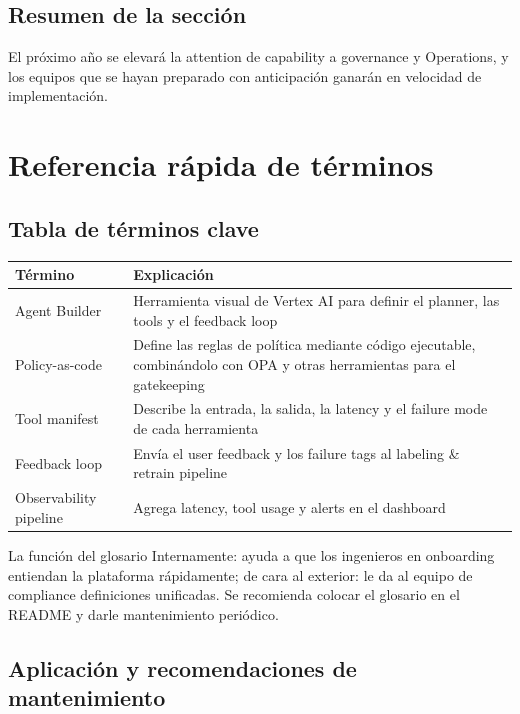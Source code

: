\documentclass[a4paper]{article}
\begin{document}
\subsection{Resumen de la sección}

El próximo año se elevará la attention de capability a governance y Operations, y los equipos que se hayan preparado con anticipación ganarán en velocidad de implementación.

\section{Referencia rápida de términos}

\subsection{Tabla de términos clave}

\begin{tabular}{p{} p{}}
\toprule
Término & Explicación \\
\midrule
Agent Builder & Herramienta visual de Vertex AI para definir el planner, las tools y el feedback loop \\
Policy-as-code & Define las reglas de política mediante código ejecutable, combinándolo con OPA y otras herramientas para el gatekeeping \\
Tool manifest & Describe la entrada, la salida, la latency y el failure mode de cada herramienta \\
Feedback loop & Envía el user feedback y los failure tags al labeling \& retrain pipeline \\
Observability pipeline & Agrega latency, tool usage y alerts en el dashboard \\
\bottomrule
\end{tabular}

\begin{importantbox}{La función del glosario}
Internamente: ayuda a que los ingenieros en onboarding entiendan la plataforma rápidamente; de cara al exterior: le da al equipo de compliance definiciones unificadas. Se recomienda colocar el glosario en el README y darle mantenimiento periódico.
\end{importantbox}

\subsection{Aplicación y recomendaciones de mantenimiento}
\end{document}
